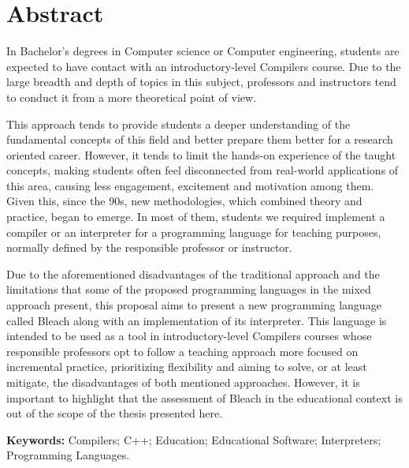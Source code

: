 \chapter*{Abstract}
\begin{spacing}{1.0}
In Bachelor's degrees in Computer science or Computer engineering, students are expected to have contact with an introductory-level Compilers course. Due to the large breadth and depth of topics in this subject, professors and instructors tend to conduct it from a more theoretical point of view. 

This approach tends to provide students a deeper understanding of the fundamental concepts of this field and better prepare them better for a research oriented career. However, it tends to limit the hands-on experience of the taught concepts, making students often feel disconnected from real-world applications of this area, causing less engagement, excitement and motivation among them. Given this, since the 90s, new methodologies, which combined theory and practice, began to emerge. In most of them, students we required implement a compiler or an interpreter for a programming language for teaching purposes, normally defined by the responsible professor or instructor.

Due to the aforementioned disadvantages of the traditional approach and the limitations that some of the proposed programming languages in the mixed approach present, this proposal aims to present a new programming language called Bleach along with an implementation of its interpreter. This language is intended to be used as a tool in introductory-level Compilers courses whose responsible professors opt to follow a teaching approach more focused on incremental practice, prioritizing flexibility and aiming to solve, or at least mitigate, the disadvantages of both mentioned approaches. However, it is important to highlight that the assessment of Bleach in the educational context is out of the scope of the thesis presented here.



\textbf{Keywords:} Compilers; C++; Education; Educational Software; Interpreters; Programming Languages.  

\end{spacing}